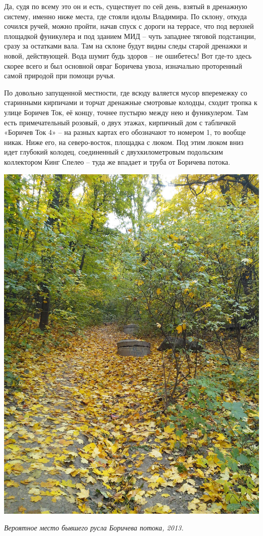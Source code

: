 Да, судя по всему это он и есть, существует по сей день, взятый в дренажную систему, именно ниже места, где стояли идолы Владимира. По склону, откуда сочился ручей, можно пройти, начав спуск с дороги на террасе, что под верхней площадкой фуникулера и под зданием МИД – чуть западнее тяговой подстанции, сразу за остатками вала. Там на склоне будут видны следы старой дренажки и новой, действующей. Вода шумит будь здоров – не ошибетесь! Вот где-то здесь скорее всего и был основной овраг Боричева увоза, изначально проторенный самой природой при помощи ручья.

По довольно запущенной местности, где всюду валяется мусор вперемежку со старинными кирпичами и торчат дренажные смотровые колодцы, сходит тропка к улице Боричев Ток, её концу, точнее пустырю между нею и фуникулером. Там есть примечательный розовый, о двух этажах, кирпичный дом с табличкой «Боричев Ток 4» – на разных картах его обозначают то номером 1, то вообще никак. Ниже его, на северо-восток, площадка с люком. Под этим люком вниз идет глубокий колодец, соединенный с двухкилометровым подольским коллектором Кинг Спелео – туда же впадает и труба от Боричева потока.

\begin{center}
\includegraphics[width=0.70\linewidth]{chast-colebanie-osnov/borichev-tok/s_borichev-IMG_20131013_150232.jpg}

\textit{Вероятное место бывшего русла Боричева потока, 2013.}
\end{center}


